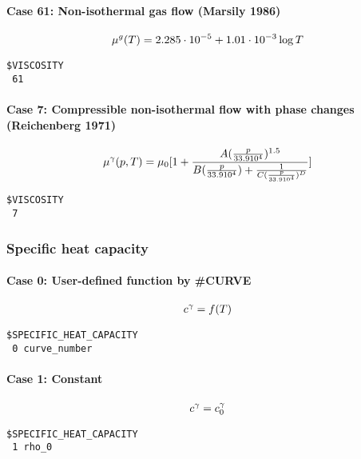 \paragraph*{Case 61: Non-isothermal gas flow (Marsily 1986)}
\begin{eqnarray}
\mu^g(T)
=
2.285\cdot10^{-5} + 1.01 \cdot10^{-3}\log{T}
\end{eqnarray}
\begin{verbatim}
$VISCOSITY
 61
\end{verbatim}

\paragraph*{Case 7: Compressible non-isothermal flow with phase changes (Reichenberg 1971)}
\begin{eqnarray}
\mu^\gamma(p,T)
=
\mu_0 [1+ \frac{A(\frac{p}{33.9
10^4})^{1.5}}{B(\frac{p}{33.9 10^4}) +
\frac{1}{C(\frac{p}{33.9 10^4})^D}}]
\end{eqnarray}
\begin{verbatim}
$VISCOSITY
 7
\end{verbatim}

\subsubsection{Specific heat capacity}

\paragraph*{Case 0: User-defined function by \#CURVE}
\begin{eqnarray}
  c^\gamma= f(T)
\end{eqnarray}
\begin{verbatim}
$SPECIFIC_HEAT_CAPACITY
 0 curve_number
\end{verbatim}

\paragraph*{Case 1: Constant}
\begin{eqnarray}
  c^\gamma = c^\gamma_0
\end{eqnarray}
\begin{verbatim}
$SPECIFIC_HEAT_CAPACITY
 1 rho_0
\end{verbatim}

